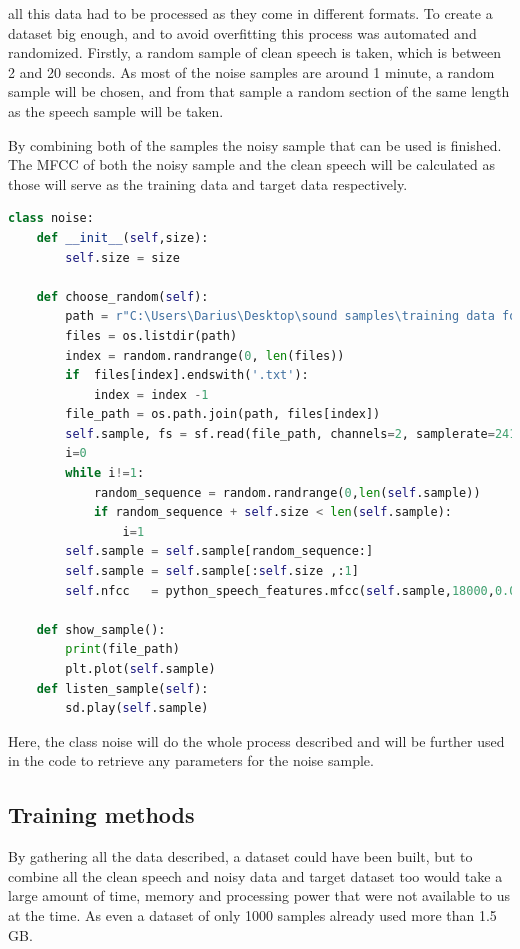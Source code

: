 all this data had to be processed as they come in different formats.
To create a dataset big enough, and to avoid overfitting this process was automated and randomized. Firstly, a random sample of clean speech is taken, which is between 2 and 20 seconds. As most of the noise samples are around 1 minute, a random sample will be chosen, and from that sample a random section of the same length as the speech sample will be taken.

By combining both of the samples the noisy sample that can be used is finished.
The MFCC of both the noisy sample and the clean speech will be calculated as those will serve as the training data and target data respectively.

\begin{lstlisting}[language=Python, caption=Noise sample gathering class]
class noise:
    def __init__(self,size):
        self.size = size
    
    def choose_random(self):
        path = r"C:\Users\Darius\Desktop\sound samples\training data for RNN\rnnoise_contributions"
        files = os.listdir(path)
        index = random.randrange(0, len(files))
        if  files[index].endswith('.txt'):
            index = index -1
        file_path = os.path.join(path, files[index])
        self.sample, fs = sf.read(file_path, channels=2, samplerate=24100,format='RAW', subtype='PCM_16')
        i=0
        while i!=1:
            random_sequence = random.randrange(0,len(self.sample))
            if random_sequence + self.size < len(self.sample):
                i=1
        self.sample = self.sample[random_sequence:]
        self.sample = self.sample[:self.size ,:1]
        self.nfcc   = python_speech_features.mfcc(self.sample,18000,0.025,0.01,24)
        
    def show_sample():
        print(file_path)
        plt.plot(self.sample)
    def listen_sample(self):
        sd.play(self.sample) 

\end{lstlisting}

Here, the class noise will do the whole process described and will be further used in the code to retrieve any parameters for the noise sample.
\newpage
\subsection{Training methods}
By gathering all the data described, a dataset could have been built, but to combine all the clean speech and noisy data and target dataset too would take a large amount of time, memory and processing power that were not available to us at the time. As even  a dataset of only 1000 samples already used more than 1.5 GB.

